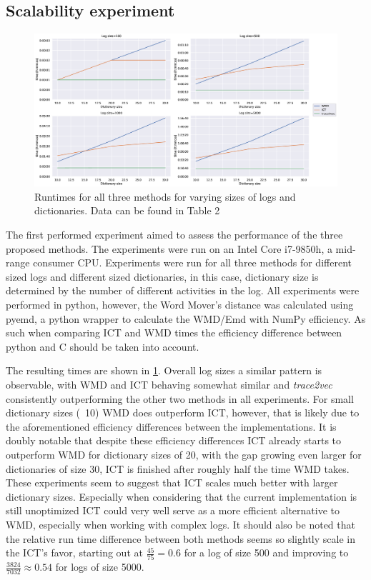 \documentclass[runningheads]{template/llncs}
\begin{document}
\subsection{Scalability experiment}
\begin{figure}
	\includegraphics[width=1\textwidth]{figures/scaling}
	\caption{Runtimes for all three methods for varying sizes of logs and dictionaries. Data can be found in \cite{MuCa10} Table 2}
	\label{fig:scalability}
\end{figure}
The first performed experiment aimed to assess the performance  of the three proposed methods.
The experiments were run on an Intel Core i7-9850h, a mid-range consumer CPU.
Experiments were run for all three methods for different sized logs and different sized dictionaries, in this case, dictionary size is determined by the number of different activities in the log.
All experiments were performed in python, however, the Word Mover's distance was calculated using pyemd, a python wrapper to calculate the WMD/Emd with NumPy efficiency.
As such when comparing ICT and WMD times the efficiency difference between python and C should be taken into account.

The resulting times are shown in \cref{fig:scalability}.
Overall log sizes a similar pattern is observable, with WMD and ICT behaving somewhat similar and \emph{trace2vec} consistently outperforming the other two methods in all experiments.
For small dictionary sizes  (~10) WMD does outperform ICT, however, that is likely due to the aforementioned efficiency differences between the implementations.
It is doubly notable that despite these efficiency differences ICT already starts to outperform WMD for dictionary sizes of 20, with the gap growing even larger for dictionaries of size 30, ICT is finished after roughly half the time WMD takes.
These experiments seem to suggest that ICT scales much better with larger dictionary sizes.
Especially when considering that the current implementation is still unoptimized ICT could very well serve as a more efficient alternative to WMD, especially when working with complex logs.
It should also be noted that the relative run time difference between both methods seems so slightly scale in the ICT's favor, starting out at $\frac{45}{75}=0.6$ for a log of size 500 and improving to $\frac{3824}{7032}\approx 0.54$ for logs of size 5000.
\end{document}
